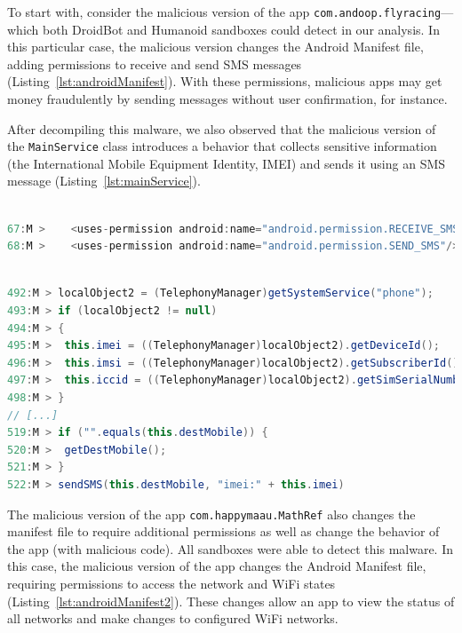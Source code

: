To start with, consider the malicious version of the app \texttt{com.andoop.flyracing}---which both DroidBot and
Humanoid sandboxes could detect in our analysis. 
In this particular case, the malicious version changes the Android Manifest file,
adding permissions to receive and send SMS messages
(Listing~\ref{lst:androidManifest}). With these permissions, malicious apps may get money
fraudulently by sending messages without user confirmation, for instance.

After decompiling this malware, we also observed that the malicious version of the
\texttt{MainService} class introduces a
behavior that collects sensitive information (the International Mobile
Equipment Identity, IMEI) and sends it using an SMS message
(Listing~\ref{lst:mainService}). 

\begin{lstlisting}[caption={Diffs in the \texttt{com.gau.screenguru.finger}
      AndroidManifest file of the malicious
      version}, language=Java,
    basicstyle=\fontsize{8}{6}\selectfont\ttfamily,
    label={lst:androidManifest}]

67:M >    <uses-permission android:name="android.permission.RECEIVE_SMS"/>
68:M >    <uses-permission android:name="android.permission.SEND_SMS"/>
\end{lstlisting}

\begin{lstlisting}[caption={Diffs in the malicious version
      of the class \texttt{com.android.main.MainService}
      (app \texttt{com.gau.screenguru.finger})},
      language=Java, basicstyle=\fontsize{8}{6}\selectfont\ttfamily,
      label={lst:mainService}]

492:M > localObject2 = (TelephonyManager)getSystemService("phone");
493:M > if (localObject2 != null)
494:M > {
495:M >  this.imei = ((TelephonyManager)localObject2).getDeviceId();
496:M >  this.imsi = ((TelephonyManager)localObject2).getSubscriberId();
497:M >  this.iccid = ((TelephonyManager)localObject2).getSimSerialNumber();
498:M > }
// [...]
519:M > if ("".equals(this.destMobile)) {
520:M >  getDestMobile();
521:M > }
522:M > sendSMS(this.destMobile, "imei:" + this.imei)
\end{lstlisting}

The malicious version of the app \texttt{com.happymaau.MathRef} also changes
the manifest file to require additional permissions as well as change
the behavior of the app (with malicious code). All sandboxes were able to
detect this malware.
In this case, the malicious version of the app changes the Android Manifest file,
requiring permissions to access the network and WiFi states (Listing~\ref{lst:androidManifest2}).
These changes allow an app
to view the status of all networks and make changes to configured WiFi networks. 


